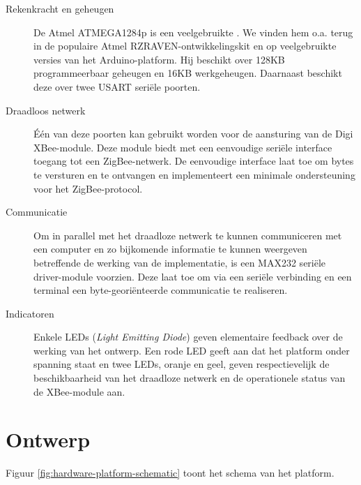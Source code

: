 \begin{description}

  \item[Rekenkracht en geheugen] De Atmel ATMEGA1284p is een veelgebruikte
  \mcu. We vinden hem o.a. terug in de populaire Atmel RZRAVEN-ontwikkelingskit
  en op veelgebruikte versies van het Arduino-platform. Hij beschikt over 128KB
  programmeerbaar geheugen en 16KB werkgeheugen. Daarnaast beschikt deze \mcu
  over twee USART seri\"ele poorten.
  
  \item[Draadloos netwerk] \'E\'en van deze poorten kan gebruikt worden voor de
  aansturing van de Digi XBee-module. Deze module biedt met een eenvoudige
  seri\"ele interface toegang tot een ZigBee-netwerk. De eenvoudige interface
  laat toe om bytes te versturen en te ontvangen en implementeert een minimale
  ondersteuning voor het ZigBee-protocol.
  
  \item[Communicatie] Om in parallel met het draadloze netwerk te kunnen
  communiceren met een computer en zo bijkomende informatie te kunnen weergeven
  betreffende de werking van de implementatie, is een MAX232 seri\"ele
  driver-module voorzien. Deze laat toe om via een seri\"ele verbinding en een
  terminal een byte-geori\"enteerde communicatie te realiseren.
  
  \item[Indicatoren] Enkele LEDs (\emph{Light Emitting Diode}) geven
  elementaire feedback over de werking van het ontwerp. Een rode LED geeft aan
  dat het platform onder spanning staat en twee LEDs, oranje en geel, geven
  respectievelijk de beschikbaarheid van het draadloze netwerk en de
  operationele status van de XBee-module aan.
  
\end{description}

\section{Ontwerp}

Figuur \ref{fig:hardware-platform-schematic} toont het schema van het platform.

